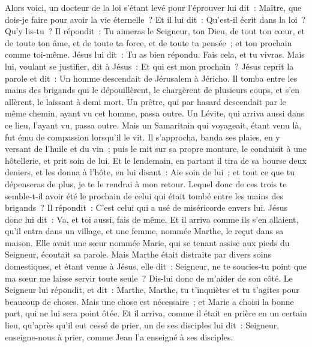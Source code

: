 \begin{multicols}{2}
Alors voici, un docteur de la loi s'étant levé pour l'éprouver lui dit~: Maître, que dois-je faire pour avoir la vie éternelle~?
Et il lui dit~: Qu'est-il écrit dans la loi~? Qu'y lis-tu~?
Il répondit~: Tu aimeras le Seigneur, ton Dieu, de tout ton cœur, et de toute ton âme, et de toute ta force, et de toute ta pensée~; et ton prochain comme toi-même.
Jésus lui dit~: Tu as bien répondu. Fais cela, et tu vivras.
Mais lui, voulant se justifier, dit à Jésus~: Et qui est mon prochain~?
Jésus reprit la parole et dit~: Un homme descendait de Jérusalem à Jéricho. Il tomba entre les mains des brigands qui le dépouillèrent, le chargèrent de plusieurs coups, et s'en allèrent, le laissant à demi mort.
Un prêtre, qui par hasard descendait par le même chemin, ayant vu cet homme, passa outre.
Un Lévite, qui arriva aussi dans ce lieu, l'ayant vu, passa outre.
Mais un Samaritain qui voyageait, étant venu là, fut ému de compassion lorsqu'il le vit.
Il s'approcha, banda ses plaies, en y versant de l'huile et du vin~; puis le mit sur sa propre monture, le conduisit à une hôtellerie, et prit soin de lui.
Et le lendemain, en partant il tira de sa bourse deux deniers, et les donna à l'hôte, en lui disant~: Aie soin de lui~; et tout ce que tu dépenseras de plus, je te le rendrai à mon retour.
Lequel donc de ces trois te semble-t-il avoir été le prochain de celui qui était tombé entre les mains des brigands~?
Il répondit~: C'est celui qui a usé de miséricorde envers lui. Jésus donc lui dit~: Va, et toi aussi, fais de même.
Et il arriva comme ils s'en allaient, qu'il entra dans un village, et une femme, nommée Marthe, le reçut dans sa maison.
Elle avait une sœur nommée Marie, qui se tenant assise aux pieds du Seigneur, écoutait sa parole.
Mais Marthe était distraite par divers soins domestiques, et étant venue à Jésus, elle dit~: Seigneur, ne te soucies-tu point que ma sœur me laisse servir toute seule~? Dis-lui donc de m'aider de son côté.
Le Seigneur lui répondit, et dit~: Marthe, Marthe, tu t'inquiètes et tu t'agites pour beaucoup de choses.
Mais une chose est nécessaire~; et Marie a choisi la bonne part, qui ne lui sera point ôtée.
\VerseOne{}Et il arriva, comme il était en prière en un certain lieu, qu'après qu'il eut cessé de prier, un de ses disciples lui dit~: Seigneur, enseigne-nous à prier, comme Jean l'a enseigné à ses disciples.

\end{multicols}
